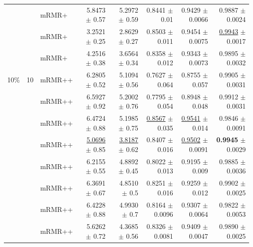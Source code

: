 \begin{longtable}{llp{}rrrrr}
 &  & mRMR+ & 5.8473 {\scriptsize $\pm$ 0.57} & 5.2972 {\scriptsize $\pm$ 0.59} & 0.8441 {\scriptsize $\pm$ 0.01} & 0.9429 {\scriptsize $\pm$ 0.0066} & 0.9887 {\scriptsize $\pm$ 0.0024} \\
 &  & mRMR+ & 3.2521 {\scriptsize $\pm$ 0.25} & 2.8629 {\scriptsize $\pm$ 0.27} & 0.8503 {\scriptsize $\pm$ 0.011} & 0.9454 {\scriptsize $\pm$ 0.0075} & \underline{0.9943} {\scriptsize $\pm$ 0.0017} \\
 &  & mRMR+ & 4.2516 {\scriptsize $\pm$ 0.38} & 3.6564 {\scriptsize $\pm$ 0.34} & 0.8358 {\scriptsize $\pm$ 0.012} & 0.9343 {\scriptsize $\pm$ 0.0073} & 0.9895 {\scriptsize $\pm$ 0.0032} \\
\midrule
10\% & 10 & mRMR++ & 6.2805 {\scriptsize $\pm$ 0.52} & 5.1094 {\scriptsize $\pm$ 0.56} & 0.7627 {\scriptsize $\pm$ 0.064} & 0.8755 {\scriptsize $\pm$ 0.057} & 0.9905 {\scriptsize $\pm$ 0.0031} \\
 &  & mRMR++ & 6.5927 {\scriptsize $\pm$ 0.92} & 5.2002 {\scriptsize $\pm$ 0.76} & 0.7795 {\scriptsize $\pm$ 0.054} & 0.8948 {\scriptsize $\pm$ 0.048} & 0.9912 {\scriptsize $\pm$ 0.0031} \\
 &  & mRMR++ & 6.4724 {\scriptsize $\pm$ 0.88} & 5.1985 {\scriptsize $\pm$ 0.75} & \underline{0.8567} {\scriptsize $\pm$ 0.035} & \underline{0.9541} {\scriptsize $\pm$ 0.014} & 0.9846 {\scriptsize $\pm$ 0.0091} \\
 &  & mRMR++ & \underline{5.0696} {\scriptsize $\pm$ 0.85} & \underline{3.8187} {\scriptsize $\pm$ 0.62} & 0.8407 {\scriptsize $\pm$ 0.016} & \underline{0.9502} {\scriptsize $\pm$ 0.0091} & \textbf{0.9945} {\scriptsize $\pm$ 0.0029} \\
 &  & mRMR++ & 6.2155 {\scriptsize $\pm$ 0.55} & 4.8892 {\scriptsize $\pm$ 0.45} & 0.8022 {\scriptsize $\pm$ 0.013} & 0.9195 {\scriptsize $\pm$ 0.009} & 0.9885 {\scriptsize $\pm$ 0.0036} \\
 &  & mRMR++ & 6.3691 {\scriptsize $\pm$ 0.67} & 4.8510 {\scriptsize $\pm$ 0.5} & 0.8251 {\scriptsize $\pm$ 0.016} & 0.9259 {\scriptsize $\pm$ 0.012} & 0.9902 {\scriptsize $\pm$ 0.0025} \\
 &  & mRMR++ & 6.4228 {\scriptsize $\pm$ 0.88} & 4.9930 {\scriptsize $\pm$ 0.7} & 0.8164 {\scriptsize $\pm$ 0.0096} & 0.9307 {\scriptsize $\pm$ 0.0064} & 0.9822 {\scriptsize $\pm$ 0.0053} \\
 &  & mRMR++ & 5.6262 {\scriptsize $\pm$ 0.72} & 4.3685 {\scriptsize $\pm$ 0.56} & 0.8326 {\scriptsize $\pm$ 0.0081} & 0.9409 {\scriptsize $\pm$ 0.0047} & 0.9890 {\scriptsize $\pm$ 0.0025} \\

\end{longtable}

